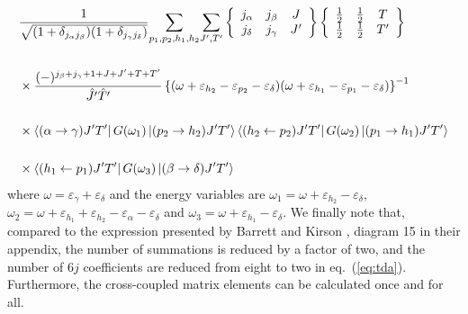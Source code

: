 \begin{eqnarray}
&{\displaystyle \frac{1}
{\sqrt{(1+\delta_{j_{\alpha}j_{\beta}})(1+\delta_{j_{\gamma}j_{\delta}})}}}
{\displaystyle\sum_{p_{1},p_{2},h_{1},h_{2}}^{}}
{\displaystyle\sum_{J',T'}^{}}
\left\{
\begin{array}{ccc}
      j_{\alpha}&j_{\beta}&J\\j_{\delta}&j_{\gamma}&J'
\end{array}
\right\}
\left\{
\begin{array}{ccc}
\frac{1}{2}&\frac{1}{2}&T\\\frac{1}{2}&\frac{1}{2}&T'
\end{array}
\right\}\nonumber\\
&\nonumber\\&\times{\displaystyle
\frac{(-)^{j_{\beta}+j_{\gamma}+1+J+J'+T+T'}}
{\hat{J}'\hat{T}'}}
\left\{(\omega+\varepsilon_{h_{2}}-\varepsilon_{p_{2}}-\varepsilon_{\delta})
(\omega+\varepsilon_{h_{1}}-
  \varepsilon_{p_{1}}-\varepsilon_{\delta})\right\}^{-1}
\nonumber\\&\nonumber
\\
&\times\left\langle (\alpha\rightarrow \gamma)J'T' \right|G(\omega_{1})
 \left| (p_2\rightarrow h_2)J'T' \right\rangle
 \left\langle (h_2\leftarrow p_2)J'T' \right|G(\omega_{2})
 \left| (p_1\rightarrow h_1)J'T' \right\rangle \nonumber\\&\nonumber \\
&\times\left\langle (h_1\leftarrow p_1)J'T' \right|G(\omega_{3})
\left| (\beta\rightarrow \delta)J'T' \right\rangle
\label{eq:tda}
\end{eqnarray}
where $\omega=\varepsilon_{\gamma}+\varepsilon_{\delta}$
and the energy variables are
$\omega_{1}=\omega+\varepsilon_{h_{2}}-\varepsilon_{\delta}$,
 $\omega_{2}=\omega+\varepsilon_{h_{1}}+
\varepsilon_{h_{2}}-\varepsilon_{\alpha}-\varepsilon_{\delta}$ and
$\omega_{3}=\omega+\varepsilon_{h_{1}}-\varepsilon_{\delta}$.
We finally note that, compared to the
expression presented by Barrett and Kirson
\cite{bk70}, diagram 15 in their appendix, the number of
summations is reduced by a factor of two, and the
number of $6j$ coefficients are reduced from eight to
two in eq.\ (\ref{eq:tda}).
Furthermore, the cross-coupled matrix elements can be calculated
once and for all.

